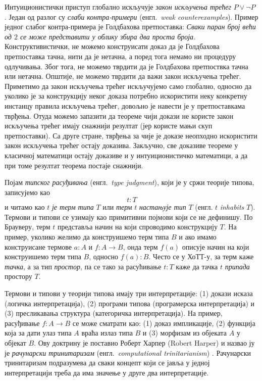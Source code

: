 \documentclass[12pt,oneside]{memoir}
\begin{document}
Интуиционистички приступ глобално искључује \emph{закон искључења трећег} $P \lor \neg P$ \cite{brw}. Један од разлог су \emph{слаби контра-примери} (енгл.~\emph{weak counterexamples}). Пример једног слабог контра-примера је Голдбахова претпоставка: \emph{Сваки паран број већи од $2$ се може представити у облику збира два проста броја}.  Конструктивистички, не можемо конструисати доказ да је Голдбахова претпоставка тачна, нити да је нетачна, а поред тога немамо ни процедуру одлучивања. Због тога, не можемо тврдити да је Голдбахова претпоствка тачна или нетачна. Општије, не можемо тврдити да важи закон искључења трећег. Приметимо да закон искључења трећег искључујемо само глобално, односно да уколико је за конструкцију неког доказа потребно искористити неку конкретну инстанцу правила искључења трећег, довољно је навести је у претпоставкама тврђења. Отуда можемо запазити да теореме чији докази не користе закон искључења трећег имају снажнији резултат (јер користе мањи скуп претпоставки). Са друге стране, тврђења за чије је доказе неопходно искористити закон искључења трећег остају доказива. Закључно, све доказиве теореме у класичној математици остају доказиве и у интуиционистичко математици, а да при томе резултат теорема постаје снажнији.

Појам \emph{типског расуђивања} (енгл.~\emph{type judgment}), који је у сржи теорије типова, записујемо као  \[t : T\] и читамо као $t$ \emph{је терм типа} $T$ или \emph{терм} $t$ \emph{настањује тип} $T$ (енгл. $t$ \emph{inhabits} $T$). Термови и типови се узимају као примитивни појмови који се не дефинишу. По Брауверу, терм $t$ представља начин на који спроводимо конструкцију $T$. На пример, уколико желимо да конструишемо терм типа $B$ и ако имамо конструисане термове $a : A$ и $f : A \to B$, онда терм $f(a)$ описује начин на који конструишемо терм типа $B$, односно $f(a) : B$. Често се у ХоТТ-у, за терм каже \emph{тачка}, а за тип \emph{простор}, па се тако за расућивање $t : T$ каже да тачка $t$ \emph{припада} простору $T$.

Термови и типови у теорији типова имају три интерпретације: (1) докази исказа (логичка интерпретација), (2) програми типова (програмерска интерпретација) и (3) пресликавања структура (категоричка интерпретација). На пример, расуђивање $f : A \to B$ се може сматрати као: (1) доказ импликације, (2) функција која за дати улаз типа $A$ враћа излаз типа $B$ и (3) морфизам из објеката $A$ у објекат $B$. Ову доктрину је поставио Роберт Харпер (Robert Harper) и назвао ју је \emph{рачунарски тринитаризам} (енгл.~\emph{computational trinitarianism}) \cite{rob11}. Рачунарски тринитаризам подразумева да сваки концепт који се јавља у једној интерпретацији треба да има значење у друге два интерпретације.  
\end{document}
